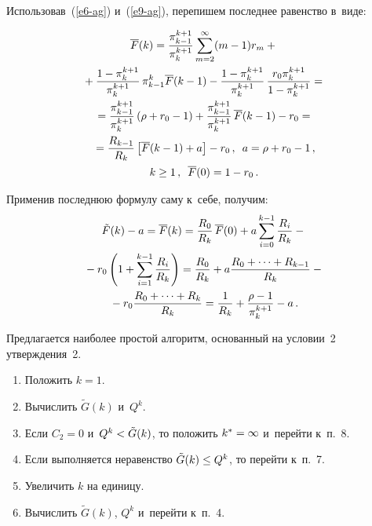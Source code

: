 \begin{multicols}{2}
  Использовав~(\ref{e6-ag}) и~(\ref{e9-ag}), перепишем последнее равенство 
в~виде:

\noindent
  \begin{multline*}
  \overline{F}(k)= \displaystyle\frac{\displaystyle \pi_{k-1}^{k+1}\mathstrut}{\displaystyle \pi_k^{k+1}\mathstrut}\sum\limits_{m=2}^\infty (m-1) r_m+{}\\
  {}+
  \displaystyle\frac{\displaystyle 1-\pi_k^{k+1}\mathstrut}{\displaystyle \pi_k^{k+1}\mathstrut} \,\pi^k_{k-1}\overline{F}(k-1)-
   \displaystyle\frac{\displaystyle 1-\pi_k^{k+1}\mathstrut}{\displaystyle \pi_k^{k+1}\mathstrut}\,\displaystyle\frac{\displaystyle r_0\pi_k^{k+1}\mathstrut}{\displaystyle 1-\pi_k^{k+1}\mathstrut}= {}\\
   {}=
\displaystyle\frac{\displaystyle \pi_{k-1}^{k+1}\mathstrut}{\displaystyle \pi_k^{k+1}\mathstrut}\left( \rho+r_0 -1\right) +\displaystyle\frac{\displaystyle \pi_{k-
1}^{k+1}\mathstrut}{\displaystyle \pi_k^{k+1}\mathstrut}\,\overline{F}(k-1) - r_0={}\\
  {}=
  \displaystyle\frac{\displaystyle R_{k-1}\mathstrut}{\displaystyle R_k\mathstrut}\left[ \overline{F}(k-1)+a\right] -r_0\,,\enskip a=\rho+r_0-1\,,\\
   k\geq 1\,,\enskip \overline{F}(0)=1-r_0\,.
  \end{multline*}
  
  Применив последнюю формулу саму к~себе, получим: 
  \begin{multline}
  \tilde{F}(k) -a=\overline{F}(k)=\fr{R_0}{R_k}\,\overline{F}(0) 
 +a\sum\limits_{i=0}^{k-1}  \fr{R_i}{R_k}-{}\\
 {}-r_0 \left( 
1+\sum\limits_{i=1}^{k-1} \fr{R_i}{R_k}\right) = \fr{R_0}{R_k} +a\fr{R_0+\cdots+R_{k-1}}{R_k} -{}\\
  {}-r_0 
\fr{R_0+\cdots+R_k}{R_k} = \fr{1}{R_k} + \fr{\rho-1}{\pi_k^{k+1}}-a\,.
  \label{e12-ag}
  \end{multline}
  
  Предлагается наиболее простой алгоритм, основанный на условии~2 
утверждения~2.
  \begin{enumerate}[1.]
\item Положить $k=1$.\\[-14pt]
\item Вычислить $\tilde{G}(k)$ и~$Q^k$.\\[-14pt]
\item Если $C_2=0$ и~$Q^k\hm<\tilde{G}(k)$, то положить $k^*\hm=\infty$ 
и~перейти к~п.~8.\\[-14pt]
\item Если выполняется неравенство $\tilde{G}(k)\hm\leq Q^k$, то перейти 
к~п.~7.\\[-14pt]
\item Увеличить $k$ на единицу.\\[-14pt]
\item Вычислить $\tilde{G}(k)$, $Q^k$ и~перейти к~п.~4.\\[-14pt]


\end{enumerate}
\end{multicols}
